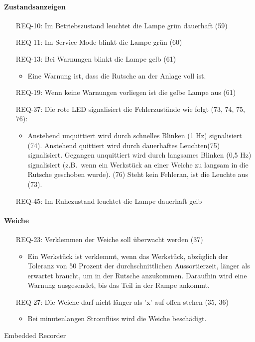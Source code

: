 \paragraph{Zustandsanzeigen}
\begin{itemize}
    \item[REQ-10:] Im Betriebszustand leuchtet die Lampe grün dauerhaft (59)
    \item[REQ-11:] Im Service-Mode blinkt die Lampe grün (60)
    \item[REQ-13:] Bei Warnungen blinkt die Lampe gelb (61)
    \begin{itemize}
        \item Eine Warnung ist, dass die Rutsche an der Anlage voll ist.
    \end{itemize}
    \item[REQ-19:] Wenn keine Warnungen vorliegen ist die gelbe Lampe aus (61)
    \item[REQ-37:] Die rote LED signalisiert die Fehlerzustände wie folgt (73, 74, 75, 76):
    \begin{itemize}
        \item Anstehend unquittiert wird durch schnelles Blinken (1 Hz) signalisiert (74).
        Anstehend quittiert wird durch dauerhaftes Leuchten(75) signalisiert.
        Gegangen unquittiert wird durch langsames Blinken (0,5 Hz) signalisiert (z.B.\ wenn ein
        Werkstück an einer Weiche zu langsam in die Rutsche geschoben wurde).
        (76) Steht kein Fehleran, ist die Leuchte aus (73).
    \end{itemize}
    \item[REQ-45:] Im Ruhezustand leuchtet die Lampe dauerhaft gelb
\end{itemize}

\paragraph{Weiche}
\begin{itemize}
    \item[REQ-23:] Verklemmen der Weiche soll überwacht werden (37)
    \begin{itemize}
        \item Ein Werkstück ist verklemmt, wenn das Werkstück, abzüglich der Toleranz von 50 Prozent
        der durchschnittlichen Aussortierzeit, länger als erwartet braucht, um in der Rutsche anzukommen.
        Daraufhin wird eine Warnung ausgesendet, bis das Teil in der Rampe ankommt.
    \end{itemize}
    \item[REQ-27:] Die Weiche darf nicht länger als 'x' auf offen stehen (35, 36)
    \begin{itemize}
        \item Bei minutenlangen Stromflüss wird die Weiche beschädigt.
    \end{itemize}
\end{itemize}
Embedded Recorder

